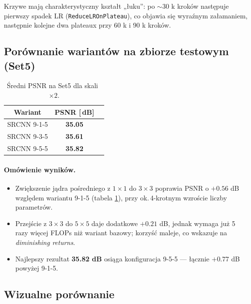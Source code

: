 \documentclass[11pt]{article}
\begin{document}
Krzywe mają charakterystyczny kształt „łuku”:
po \(\sim\)30 k kroków następuje pierwszy spadek
LR (\texttt{ReduceLROnPlateau}), co objawia się wyraźnym załamaniem,
następnie kolejne dwa plateaux przy 60 k i 90 k kroków.

\subsection{Porównanie wariantów na zbiorze testowym (Set5)}

\begin{table}[h]
\centering
\begin{tabular}{@{}ccc@{}}
\toprule
Wariant & PSNR [$\,$dB] \\ \midrule
SRCNN 9-1-5  & \textbf{35.05} \\
SRCNN 9-3-5  & \textbf{35.61} \\
SRCNN 9-5-5  & \textbf{35.82} \\ \bottomrule
\end{tabular}
\caption{Średni PSNR na Set5 dla skali~$\times2$.}
\label{tab:test_psnr}
\end{table}


\paragraph{Omówienie wyników.}
\begin{itemize}
  \item Zwiększenie jądra pośredniego z \(1\times1\) do \(3\times3\)
        poprawia PSNR o \(+0.56\) dB względem wariantu 9-1-5
        (tabela \ref{tab:test_psnr}), przy ok.\,4-krotnym wzroście
        liczby parametrów.
  \item Przejście z \(3\times3\) do \(5\times5\) daje dodatkowe
        \(+0.21\) dB, jednak wymaga już 5 razy więcej FLOPs niż
        wariant bazowy; korzyść maleje, co wskazuje na
        \emph{diminishing returns}.
  \item Najlepszy rezultat \textbf{35.82 dB} osiąga konfiguracja 9-5-5
        — łącznie \(+0.77\) dB powyżej 9-1-5.
\end{itemize}

\subsection{Wizualne porównanie}
\end{document}
